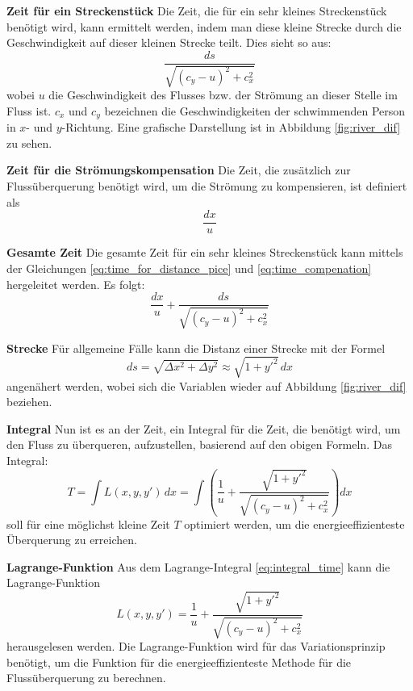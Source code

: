 \textbf{Zeit für ein Streckenstück} Die Zeit, die für ein sehr kleines Streckenstück benötigt wird, kann ermittelt werden, indem man diese kleine Strecke durch die Geschwindigkeit auf dieser kleinen Strecke teilt. Dies sieht so aus:
\begin{equation}\label{eq:time_for_distance_pice}
    \frac{ds}{\sqrt{(c_y - u)^2 + c_x^2}}
\end{equation}
wobei \(u\) die Geschwindigkeit des Flusses bzw. der Strömung an dieser Stelle im Fluss ist. \(c_x\) und \(c_y\) bezeichnen die Geschwindigkeiten der schwimmenden Person in \(x\)- und \(y\)-Richtung. Eine grafische Darstellung ist in Abbildung \ref{fig:river_dif} zu sehen.

\textbf{Zeit für die Strömungskompensation} Die Zeit, die zusätzlich zur Flussüberquerung benötigt wird, um die Strömung zu kompensieren, ist definiert als 
\begin{equation}\label{eq:time_compenation}
    \frac{dx}{u}
\end{equation}

\textbf{Gesamte Zeit} Die gesamte Zeit für ein sehr kleines Streckenstück kann mittels der Gleichungen \ref{eq:time_for_distance_pice} und \ref{eq:time_compenation} hergeleitet werden. Es folgt:
\begin{equation}\label{eq:time_pice_total}
    \frac{dx}{u} + \frac{ds}{\sqrt{(c_y - u)^2 + c_x^2}}
\end{equation}

\textbf{Strecke}
Für allgemeine Fälle kann die Distanz einer Strecke mit der Formel
\[
ds = \sqrt{\Delta x^2 + \Delta y^2} \approx \sqrt{1 + y'^2} \, dx
\]
angenähert werden, wobei sich die Variablen wieder auf Abbildung \ref{fig:river_dif} beziehen.

\textbf{Integral} Nun ist es an der Zeit, ein Integral für die Zeit, die benötigt wird, um den Fluss zu überqueren, aufzustellen, basierend auf den obigen Formeln. Das Integral:
\begin{equation}\label{eq:integral_time}
    T = \int L(x, y, y') \, dx = \int \left( \frac{1}{u} + \frac{\sqrt{1 + y'^2}}{\sqrt{(c_y - u)^2 + c_x^2}} \right) dx
\end{equation}
soll für eine möglichst kleine Zeit \(T\) optimiert werden, um die energieeffizienteste Überquerung zu erreichen.

\textbf{Lagrange-Funktion} Aus dem Lagrange-Integral \ref{eq:integral_time} kann die Lagrange-Funktion
\begin{equation}\label{eq:lagrange_integral}
    L(x, y, y') = \frac{1}{u} + \frac{\sqrt{1 + y'^2}}{\sqrt{(c_y - u)^2 + c_x^2}}
\end{equation}
herausgelesen werden. Die Lagrange-Funktion wird für das Variationsprinzip benötigt, um die Funktion für die energieeffizienteste Methode für die Flussüberquerung zu berechnen.


